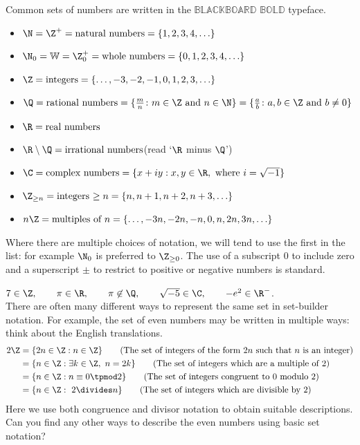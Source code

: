 Common sets of numbers are written in the $\mathbb{B}${\scriptsize $\mathbb{LACKBOARD}$} $\mathbb{B}${\scriptsize $\mathbb{OLD}$} typeface.
\begin{itemize}\setlength{\itemsep}{0pt}
  \item[] $\N=\Z^+=\text{natural numbers}=\{1,2,3,4,\ldots\}$
	\item[] $\N_0=\mathbb{W}=\Z_0^+=\text{whole numbers}=\{0,1,2,3,4,\ldots\}$
	\item[] $\Z=\text{integers}=\{\ldots,-3,-2,-1,0,1,2,3,\ldots\}$
	\item[] $\Q=\text{rational numbers}=\{\frac mn\colon m\in\Z\text{ and }n\in\N\} =\{\frac ab\colon a,b\in\Z\text{ and }b\neq 0\}$
	\item[] $\R=\text{real numbers}$
	\item[] $\R\setminus\Q=\text{irrational numbers}$\qquad (read `$\R$ minus $\Q$')
	\item[] $\C=\text{complex numbers}=\{x+iy:x,y\in\R,\text{ where }i=\sqrt{-1}\}$
	\item[] $\Z_{\ge n}=\text{integers $\ge n$}=\{n,n+1,n+2,n+3,\ldots\}$
	\item[] $n\Z=\text{multiples of $n$}=\{\ldots,-3n,-2n,-n,0,n,2n,3n,\ldots\}$
\end{itemize}

\noindent Where there are multiple choices of notation, we will tend to use the first in the list: for example $\N_0$ is preferred to $\Z_{\ge 0}$. The use of a subscript $0$ to include zero and a superscript $\pm$ to restrict to positive or negative numbers is standard.

\begin{exs}
\quad$7\in\Z,\qquad \pi\in\R,\qquad \pi\not\in\Q,\qquad \sqrt{-5}\in\C,\qquad -e^2\in\R^-$.\\

\noindent There are often many different ways to represent the same set in set-builder notation. For example, the set of even numbers may be written in multiple ways: think about the English translations.
\begin{align*}
2\Z&=\{2n\in\Z:n\in\Z\}\tag*{(The set of integers of the form $2n$ such that $n$ is an integer)}\\
&=\{n\in\Z:\exists k\in\Z,\ n=2k\} \tag*{(The set of integers which are a multiple of 2)}\\
&=\{n\in\Z:n\equiv 0\tpmod 2\}\tag*{(The set of integers congruent to 0 modulo 2)}\\
&=\{n\in\Z:\ 2\divides n\}\tag*{(The set of integers which are divisible by 2)}
\end{align*}
Here we use both congruence and divisor notation to obtain suitable descriptions. Can you find any other ways to describe the even numbers using basic set notation?
\end{exs}

